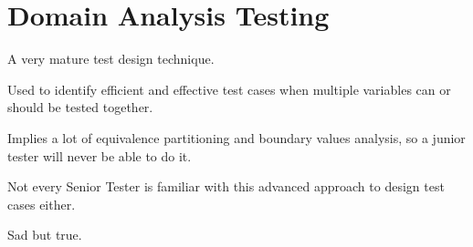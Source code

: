 \section{Domain Analysis Testing}
\label{sec:Domain Analysis Testing}

A very mature test design technique.

Used to identify efficient and effective test cases when multiple variables can or should be tested together.

Implies a lot of equivalence partitioning and boundary values analysis, so a junior tester will never be able to do it.

Not every Senior Tester is familiar with this advanced approach to design test cases either.

Sad but true.
